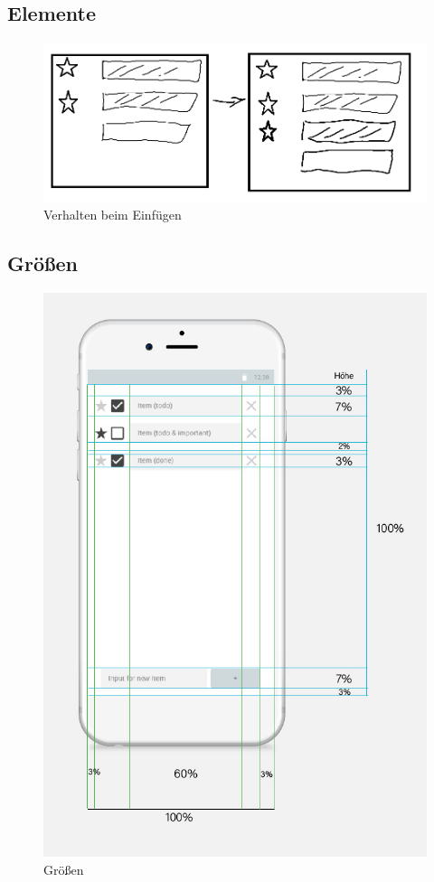 \subsection{Elemente}

\begin{figure}[h]
        \includegraphics[width=\linewidth]{img/sketch_insert.png}
        \centering
        \caption{Verhalten beim Einfügen}
        \label{fig:inserttodo}
\end{figure}

\subsection{Größen}
\begin{figure}[h]
        \includegraphics[scale=0.5]{img/Wireframe_dimensions.jpg}
        \centering
        \caption{Größen}
        \label{fig:dimensions}
\end{figure}

